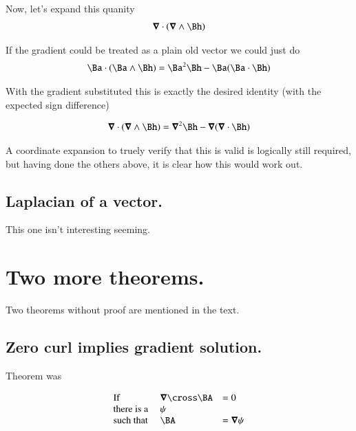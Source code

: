 \documentclass{article}
\begin{document}
Now, let's expand this quanity
\begin{align*}
\spacegrad \cdot (\spacegrad \wedge \Bh)
\end{align*}

If the gradient could be treated as a plain old vector we could just do
\begin{align*}
\Ba \cdot (\Ba \wedge \Bh) &= \Ba^2 \Bh - \Ba(\Ba \cdot \Bh) \\
\end{align*}

With the gradient substituted this is exactly the desired identity (with the expected sign difference)

\begin{align*}
\spacegrad \cdot (\spacegrad \wedge \Bh) &= \spacegrad^2 \Bh - \spacegrad(\spacegrad \cdot \Bh) \\
\end{align*}

A coordinate expansion to truely verify that this is valid is logically still required, but having done the others above, it is clear how this
would work out.

\subsection{ Laplacian of a vector. }

This one isn't interesting seeming.

\section{ Two more theorems. }

Two theorems without proof are mentioned in the text.

\subsection{ Zero curl implies gradient solution. }

Theorem was

\begin{equation*}
\begin{array}{l l l}
\text{If} &          \spacegrad \cross \BA &= 0 \\
\text{there is a } &                  \psi &    \\
\text{such that  } & \BA &= \spacegrad \psi \\
\end{array} 
\end{equation*}
\end{document}
